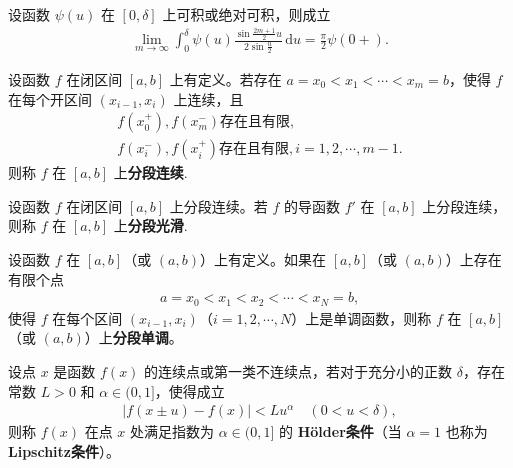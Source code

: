 \documentclass[../../main.tex]{subfiles}%
\begin{document}
\begin{corollary}
设函数 $\psi(u)$ 在 $[0,\delta]$ 上可积或绝对可积，则成立
\begin{align*}
\lim_{m \to \infty} \int_0^\delta \psi(u) \frac{\sin \frac{2m+1}{2}u}{2\sin \frac{u}{2}} \,\mathrm{d}u = \frac{\pi}{2} \psi(0+).
\end{align*}
\end{corollary}

\begin{definition}[分段连续]
设函数 $f$ 在闭区间 $[a,b]$ 上有定义。若存在 $a = x_0 < x_1 < \cdots < x_m = b$，使得 $f$ 在每个开区间 $(x_{i-1}, x_i)$ 上连续，且
\begin{gather*}
f(x_0^+),f(x_m^-)\text{存在且有限},
\\
f(x_i^-),f(x_i^+)\text{存在且有限},i=1,2,\cdots,m-1.
\end{gather*}
则称 $f$ 在 $[a,b]$ 上\textbf{分段连续}.
\end{definition}

\begin{definition}[分段光滑]
设函数 $f$ 在闭区间 $[a,b]$ 上分段连续。若 $f$ 的导函数 $f'$ 在 $[a,b]$ 上分段连续，则称 $f$ 在 $[a,b]$ 上\textbf{分段光滑}.
\end{definition}

\begin{definition}
设函数 $f$ 在 $[a, b]$（或 $(a, b)$）上有定义。如果在 $[a, b]$（或 $(a, b)$）上存在有限个点
\begin{align*}
a = x_0 < x_1 < x_2 < \cdots < x_N = b,
\end{align*}
使得 $f$ 在每个区间 $(x_{i-1}, x_i)$（$i = 1, 2, \cdots, N$）上是单调函数，则称 $f$ 在 $[a, b]$（或 $(a, b)$）上\textbf{分段单调}。
\end{definition}

\begin{definition}
设点 $x$ 是函数 $f(x)$ 的连续点或第一类不连续点，若对于充分小的正数 $\delta$，存在常数 $L > 0$ 和 $\alpha \in (0, 1]$，使得成立
\begin{align*}
|f(x \pm u) - f(x)| < L u^\alpha \quad (0 < u < \delta),
\end{align*}
则称 $f(x)$ 在点 $x$ 处满足指数为 $\alpha \in (0, 1]$ 的 \textbf{Hölder条件}（当 $\alpha = 1$ 也称为 \textbf{Lipschitz条件}）。
\end{definition}
\end{document}
